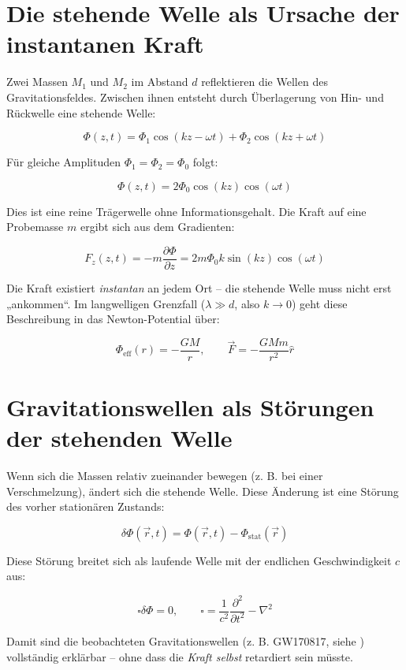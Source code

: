 \section{Die stehende Welle als Ursache der instantanen Kraft}
\label{sec:stehende_welle}

Zwei Massen \(M_1\) und \(M_2\) im Abstand \(d\) reflektieren die Wellen des Gravitationsfeldes. Zwischen ihnen entsteht durch Überlagerung von Hin- und Rückwelle eine stehende Welle:

\[
\Phi(z, t) = \Phi_1 \cos(kz - \omega t) + \Phi_2 \cos(kz + \omega t)
\]

Für gleiche Amplituden \(\Phi_1 = \Phi_2 = \Phi_0\) folgt:

\[
\Phi(z, t) = 2\Phi_0 \cos(kz) \cos(\omega t)
\]

Dies ist eine reine Trägerwelle ohne Informationsgehalt. Die Kraft auf eine Probemasse \(m\) ergibt sich aus dem Gradienten:

\[
F_z(z, t) = -m \frac{\partial \Phi}{\partial z} = 2m \Phi_0 k \sin(kz) \cos(\omega t)
\]

Die Kraft existiert \emph{instantan} an jedem Ort – die stehende Welle muss nicht erst „ankommen“. Im langwelligen Grenzfall (\(\lambda \gg d\), also \(k \to 0\)) geht diese Beschreibung in das Newton-Potential über:

\[
\Phi_{\text{eff}}(r) = -\frac{GM}{r}, \qquad \vec{F} = -\frac{GMm}{r^2} \hat{r}
\]

\section{Gravitationswellen als Störungen der stehenden Welle}
\label{sec:gravitationswellen_stoerung}

Wenn sich die Massen relativ zueinander bewegen (z. B. bei einer Verschmelzung), ändert sich die stehende Welle. Diese Änderung ist eine Störung des vorher stationären Zustands:

\[
\delta \Phi(\vec{r}, t) = \Phi(\vec{r}, t) - \Phi_{\text{stat}}(\vec{r})
\]

Diese Störung breitet sich als laufende Welle mit der endlichen Geschwindigkeit \(c\) aus:

\[
\square \delta \Phi = 0, \qquad \square = \frac{1}{c^2} \frac{\partial^2}{\partial t^2} - \nabla^2
\]

Damit sind die beobachteten Gravitationswellen (z. B. GW170817, siehe \cite{LIGO2017}) vollständig erklärbar – ohne dass die \emph{Kraft selbst} retardiert sein müsste.

